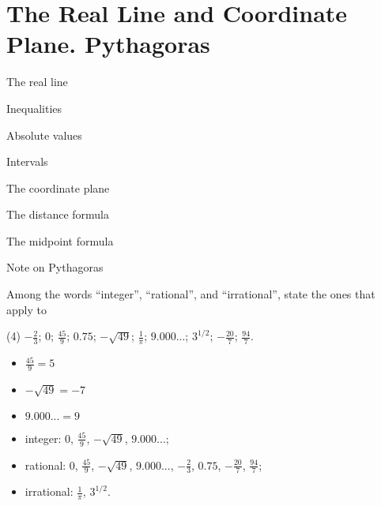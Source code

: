 \section{The Real Line and Coordinate Plane. Pythagoras}
\begin{introduction}
  \item The real line
  \item Inequalities
  \item Absolute values
  \item Intervals
  \item The coordinate plane
  \item The distance formula
  \item The midpoint formula
  \item Note on Pythagoras
\end{introduction}
\begin{questions}
  \item Among the words ``integer'', ``rational'', and ``irrational'', state the ones that apply to
  \begin{tasks}(4)
    \task \(-\frac{2}{3}\);
    \task \(0\);
    \task \(\frac{45}{9}\);
    \task \(0.75\);
    \task \(-\sqrt{49}\);
    \task \(\frac{1}{\pi}\);
    \task \(9.000...\);
    \task \(3^{1/2}\);
    \task \(-\frac{20}{7}\);
    \task \(\frac{94}{7}\).
  \end{tasks}

  \begin{note}
    \begin{itemize}
      \item \(\frac{45}{9} = 5\)
      \item \(-\sqrt{49} = -7\)
      \item \(9.000... = 9\)
    \end{itemize}
  \end{note}

  \begin{solution}
    \begin{itemize}
      \item integer: \(0\), \(\frac{45}{9}\), \(-\sqrt{49}\), \(9.000...\);
      \item rational: \(0\), \(\frac{45}{9}\), \(-\sqrt{49}\), \(9.000...\), \(-\frac{2}{3}\), \(0.75\), \(-\frac{20}{7}\), \(\frac{94}{7}\);
      \item irrational: \(\frac{1}{\pi}\), \(3^{1/2}\).
    \end{itemize}
  \end{solution}


\end{questions}
